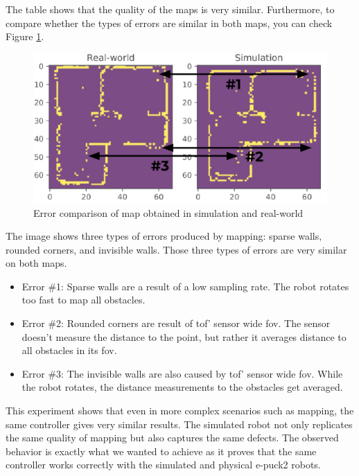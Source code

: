 The table shows that the quality of the maps is very similar.
Furthermore, to compare whether the types of errors are similar in both maps, you can check Figure \ref{fig:results:map_features}.

\begin{figure}[H]
    \centering
    \includegraphics[width=\textwidth]{./results/figures/map_features.pdf}
    \caption{Error comparison of map obtained in simulation and real-world}
    \label{fig:results:map_features}
\end{figure}

The image shows three types of errors produced by mapping: sparse walls, rounded corners, and invisible walls.
Those three types of errors are very similar on both maps.
\begin{itemize}
    \item Error \#1: Sparse walls are a result of a low sampling rate. The robot rotates too fast to map all obstacles.
    \item Error \#2: Rounded corners are result of \ac{tof}' sensor wide \ac{fov}. The sensor doesn't measure the distance to the point, but rather it averages distance to all obstacles in its \ac{fov}.
    \item Error \#3: The invisible walls are also caused by \ac{tof}' sensor wide \ac{fov}. While the robot rotates, the distance measurements to the obstacles get averaged.
\end{itemize}

This experiment shows that even in more complex scenarios such as mapping, the same controller gives very similar results.
The simulated robot not only replicates the same quality of mapping but also captures the same defects. 
The observed behavior is exactly what we wanted to achieve as it proves that the same controller works correctly with the simulated and physical e-puck2 robots.


